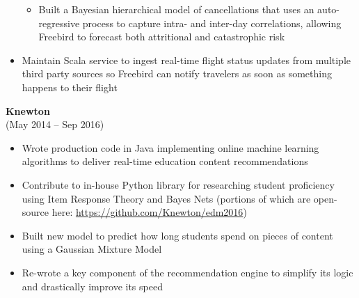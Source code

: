 \documentclass{res}
\begin{document}
\begin{resume}
\begin{itemize}
\begin{itemize}
    \item Built a Bayesian hierarchical model of cancellations that uses an auto-regressive process to capture intra- and inter-day correlations, allowing Freebird to forecast both attritional and catastrophic risk
    \end{itemize}
    \setlength{\parskip}{2.0pt} 
  \item Maintain Scala service to ingest real-time flight status updates from multiple third party sources so Freebird can notify travelers as soon as something happens to their flight
  \end{itemize}

  {\bf Knewton} \\ 
   \hspace{3pt} (May 2014 -- Sep 2016)
  \vspace{2pt}
  \begin{itemize} \itemsep 2.0pt %
  \item Wrote production code in Java implementing online machine learning algorithms to deliver real-time education content recommendations
  \item Contribute to in-house Python library for researching student proficiency using Item Response Theory and Bayes Nets (portions of which are open-source here: \href{https://github.com/Knewton/edm2016}{https://github.com/Knewton/edm2016})
  \item Built new model to predict how long students spend on pieces of content using a Gaussian Mixture Model
  \item Re-wrote a key component of the recommendation engine to simplify its logic and drastically improve its speed
    
  \end{itemize}


\end{resume}
\end{document}
